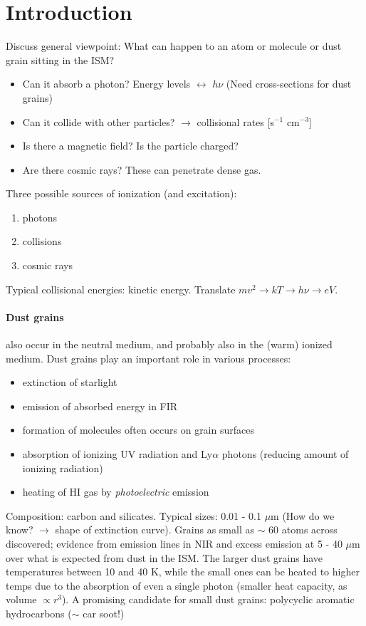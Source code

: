 \documentclass[12pt]{article}
\newcommand{\mar}[1]{\hspace{0pt}\marginpar{-{#1}-}}
\begin{document}
\tableofcontents\newpage

\reversemarginpar
\section{Introduction}
\mar{6}Discuss general viewpoint: What can happen to an atom or molecule or dust
grain sitting in the ISM?
\begin{itemize}
    \item Can it absorb a photon? Energy levels $\leftrightarrow$ $h\nu$
        (Need cross-sections for dust grains)
    \item Can it collide with other particles? $\rightarrow$ collisional
        rates [s$^{-1}$ cm$^{-3}$]
    \item Is there a magnetic field? Is the particle charged?
    \item Are there cosmic rays? These can penetrate dense gas.
\end{itemize}
Three possible sources of ionization (and excitation):
\begin{enumerate}
    \item photons
    \item collisions
    \item cosmic rays
\end{enumerate}
Typical collisional energies: kinetic energy.
Translate $mv^{2} \rightarrow kT \rightarrow h\nu \rightarrow eV$.

\paragraph{Dust grains} also occur in the neutral medium, and
probably also in the (warm) ionized medium. Dust grains play an important
role in various processes:
\begin{itemize}
    \item extinction of starlight
    \item emission of absorbed energy in FIR
    \item formation of molecules often occurs on grain surfaces
    \item absorption of ionizing UV radiation and Ly$\alpha$ photons
        (reducing amount of ionizing radiation)
    \item heating of HI gas by \emph{photoelectric} emission
\end{itemize}
Composition: carbon and silicates. Typical sizes: 0.01 - 0.1 $\mu$m
(How do we know? $\rightarrow$ shape of extinction curve). Grains as small
as $\sim$ 60 atoms across discovered; evidence from emission lines in NIR
and excess emission at 5 - 40 $\mu$m over what is expected from dust in the ISM\@.
The larger dust grains have temperatures between 10 and 40 K, while the small
ones can be heated to higher temps due to the absorption of even a single
photon (smaller heat capacity, as volume $\propto r^{3}$). A promising
candidate for small dust grains: polycyclic aromatic hydrocarbons
($\sim$ car soot!)
\end{document}
